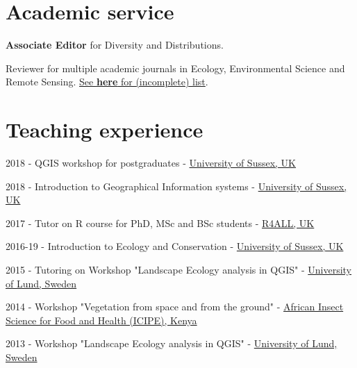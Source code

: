 \documentclass[12pt,a4paper,serif]{moderncv}        %
\begin{document}
\section{Academic service}

\begin{bibenum}

     \item[] \textbf{Associate Editor} for Diversity and Distributions. 
     \item[] Reviewer for multiple academic journals in Ecology, Environmental Science and Remote Sensing. \href{https://publons.com/author/589847/martin-jung}{See \textbf{here} for (incomplete) list}.

\end{bibenum}

\vspace{8pt}

\section{Teaching experience}

\begin{bibenum}

     \item[] 2018 - QGIS workshop for postgraduates - \href{http://sussex.ac.uk/}{University of Sussex, UK}
     
     \item[] 2018 - Introduction to Geographical Information systems - \href{http://sussex.ac.uk/}{University of Sussex, UK}

     \item[] 2017 - Tutor on R course for PhD, MSc and BSc students - \href{http://www.r4all.org/}{R4ALL, UK}
     
     \item[] 2016-19 - Introduction to Ecology and Conservation - \href{http://sussex.ac.uk/}{University of Sussex, UK}

     \item[] 2015 - Tutoring on Workshop "Landscape Ecology analysis in QGIS" - \href{http://www.lunduniversity.lu.se/}{University of Lund, Sweden}

     \item[] 2014 - Workshop "Vegetation from space and from the ground" - \href{http://www.icipe.org/}{African Insect Science for Food and Health (ICIPE), Kenya}

     \item[] 2013 - Workshop "Landscape Ecology analysis in QGIS" - \href{http://www.lunduniversity.lu.se/}{University of Lund, Sweden}

\end{bibenum}
\end{document}
